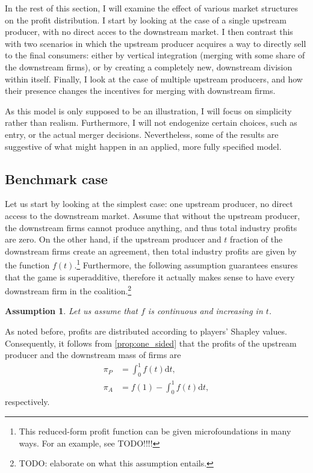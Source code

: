 \documentclass[a4paper]{article}
\newtheorem{assumption}{Assumption}
\newcommand{\dt}{\mathrm{d}t}
\begin{document}
In the rest of this section, I will examine the effect of various market structures on the profit distribution.
I start by looking at the case of a single upstream producer, with no direct acces to the downstream market.
I then contrast this with two scenarios in which the upstream producer acquires a way to directly sell to the final consumers: either by vertical integration (merging with some share of the downstream firms), or by creating a completely new, downstream division within itself.
Finally, I look at the case of multiple upstream producers, and how their presence changes the incentives for merging with downstream firms.

As this model is only supposed to be an illustration, I will focus on simplicity rather than realism.
Furthermore, I will not endogenize certain choices, such as entry, or the actual merger decisions.
Nevertheless, some of the results are suggestive of what might happen in an applied, more fully specified model.


\subsection{Benchmark case}

Let us start by looking at the simplest case: one upstream producer, no direct access to the downstream market.
Assume that without the upstream producer, the downstream firms cannot produce anything, and thus total industry profits are zero.
On the other hand, if the upstream producer and $t$ fraction of the downstream firms create an agreement, then total industry profits are given by the function $f(t)$.\footnote{
    This reduced-form profit function can be given microfoundations in many ways.
    For an example, see TODO!!!!
}
Furthermore, the following assumption guarantees ensures that the game is superadditive, therefore it actually makes sense to have every downstream firm in the coalition.\footnote{
    TODO: elaborate on what this assumption entails.
}
\begin{assumption}
    Let us assume that $f$ is continuous and increasing in $t$.
\end{assumption}

As noted before, profits are distributed according to players' Shapley values.
Consequently, it follows from \cref{prop:one_sided} that the profits of the upstream producer and the downstream mass of firms are
\begin{align*}
    \pi_P & = \int_0^1 f(t) \dt, \\
    \pi_A & = f(1) - \int_0^1 f(t) \dt,
\end{align*}
respectively.
\end{document}
